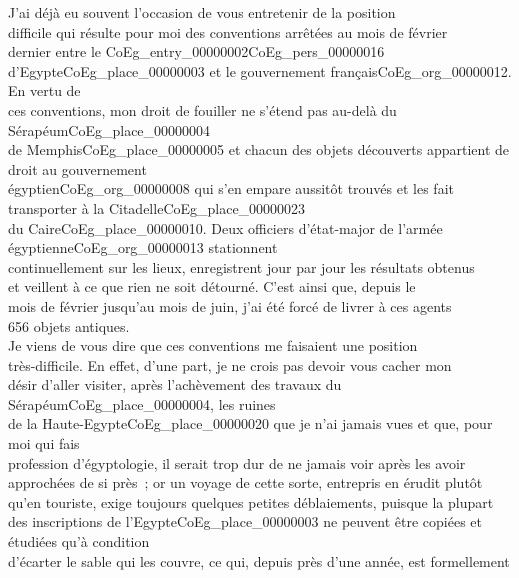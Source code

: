 \documentclass{book}
\begin{document}
\indent J’ai déjà eu souvent l’occasion de vous entretenir de la position\\
difficile qui résulte pour moi des conventions arrêtées au mois de février\\
dernier entre le \gls{CoEg_entry_00000002}\gls{CoEg_pers_00000016} d’Egypte\gls{CoEg_place_00000003} et le gouvernement français\gls{CoEg_org_00000012}. En vertu de\\
ces conventions, mon droit de fouiller ne s’étend pas au-delà du Sérapéum\gls{CoEg_place_00000004}\\
de Memphis\gls{CoEg_place_00000005} et chacun des objets découverts appartient de droit au gouvernement\\
égyptien\gls{CoEg_org_00000008} qui s'en empare aussitôt trouvés et les fait transporter à la Citadelle\gls{CoEg_place_00000023}\\
du Caire\gls{CoEg_place_00000010}. Deux officiers d’état-major de l’armée égyptienne\gls{CoEg_org_00000013} stationnent\\
continuellement sur les lieux, enregistrent jour par jour les résultats obtenus\\
et veillent à ce que rien ne soit détourné. C’est ainsi que, depuis le\\
mois de février jusqu’au mois de juin, j’ai été forcé de livrer à ces agents\\
656 objets antiques.\\
\indent Je viens de vous dire que ces conventions me faisaient une position\\
très-difficile. En effet, d’une part, je ne crois pas devoir vous cacher mon\\
désir d’aller visiter, après l’achèvement des travaux du Sérapéum\gls{CoEg_place_00000004}, les ruines\\
de la Haute-Egypte\gls{CoEg_place_00000020} que je n’ai jamais vues et que, pour moi qui fais\\
profession d’égyptologie, il serait trop dur de ne jamais voir après les avoir\\
approchées de si près~; or un voyage de cette sorte, entrepris en érudit plutôt\\
qu’en touriste, exige toujours quelques petites déblaiements, puisque la plupart\\
des inscriptions de l’Egypte\gls{CoEg_place_00000003} ne peuvent être copiées et étudiées qu’à condition\\
d’écarter le sable qui les couvre, ce qui, depuis près d’une année, est formellement\\
\end{document}

